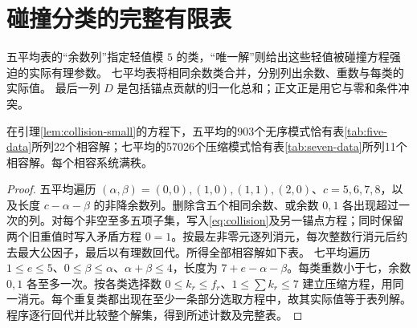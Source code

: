 \section{碰撞分类的完整有限表}
五平均表的“余数列”指定轻值模 $5$ 的类，“唯一解”则给出这些轻值被碰撞方程强迫的实际有理参数。
七平均表将相同余数类合并，分别列出余数、重数与每类的实际值。
最后一列 $D$ 是包括锚点贡献的归一化总和；正文正是用它与零和条件冲突。

\begin{proposition}[碰撞分类证书]\label{prop:collision-certificate}
在引理\ref{lem:collision-small}的方程下，五平均的903个无序模式恰有表\ref{tab:five-data}所列22个相容解；七平均的57026个压缩模式恰有表\ref{tab:seven-data}所列11个相容解。每个相容系统满秩。
\end{proposition}
\begin{proof}
五平均遍历 $(\alpha,\beta)=(0,0),(1,0),(1,1),(2,0)$、$c=5,6,7,8$，以及长度 $c-\alpha-\beta$ 的非降余数列。删除含五个相同余数、或余数 $0,1$ 各出现超过一次的列。对每个非空至多五项子集，写入\eqref{eq:collision}及另一锚点方程；同时保留两个旧重值时写入矛盾方程 $0=1$。按最左非零元逐列消元，每次整数行消元后约去最大公因子，最后以有理数回代。所得全部相容解如下表。
七平均遍历 $1\le e\le5$、$0\le\beta\le\alpha$、$\alpha+\beta\le4$，长度为 $7+e-\alpha-\beta$。每类重数小于七，余数 $0,1$ 各至多一次。按各类选择数 $0\le k_r\le f_r$、$1\le\sum k_r\le7$ 建立压缩方程，用同一消元。每个重复类都出现在至少一条部分选取方程中，故其实际值等于表列解。程序逐行回代并比较整个解集，得到所述计数及完整表。
\end{proof}

